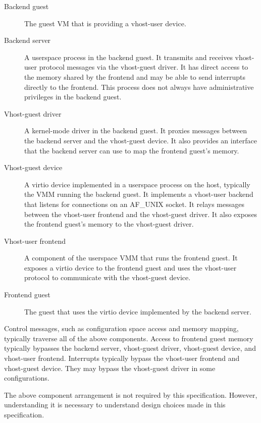 \begin{description}
\item[Backend guest] The guest VM that is providing a vhost-user
    device.

\item[Backend server] A userspace process in the backend guest.
    It transmits and receives vhost-user protocol messages via
    the vhost-guest driver. It has direct access to the memory
    shared by the frontend and may be able to send interrupts
    directly to the frontend. This process does not always have
    administrative privileges in the backend guest.

\item[Vhost-guest driver] A kernel-mode driver in the backend
    guest. It proxies messages between the backend server and the
    vhost-guest device. It also provides an interface that the
    backend server can use to map the frontend guest's memory.

\item[Vhost-guest device] A virtio device implemented in a
    userspace process on the host, typically the VMM running the
    backend guest. It implements a vhost-user backend that
    listens for connections on an AF_UNIX socket. It relays
    messages between the vhost-user frontend and the vhost-guest
    driver. It also exposes the frontend guest's memory to the
    vhost-guest driver.

\item[Vhost-user frontend] A component of the userspace VMM that
    runs the frontend guest. It exposes a virtio device to the
    frontend guest and uses the vhost-user protocol to
    communicate with the vhost-guest device.

\item[Frontend guest] The guest that uses the virtio device
    implemented by the backend server.
\end{description}

Control messages, such as configuration space access and memory
mapping, typically traverse all of the above components. Access
to frontend guest memory typically bypasses the backend server,
vhost-guest driver, vhost-guest device, and vhost-user frontend.
Interrupts typically bypass the vhost-user frontend and
vhost-guest device. They may bypass the vhost-guest driver in
some configurations.

The above component arrangement is not required by this
specification. However, understanding it is necessary to
understand design choices made in this specification.

